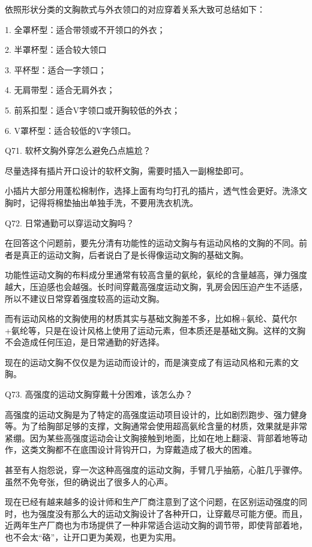 \documentclass[12pt,UTF8]{ctexbook}
\begin{document}
依照形状分类的文胸款式与外衣领口的对应穿着关系大致可总结如下：

1. 全罩杯型：适合带领或不开领口的外衣；

2. 半罩杯型：适合较大领口



3. 平杯型：适合一字领口；

4. 无肩带型：适合无肩外衣；

5. 前系扣型：适合V字领口或开胸较低的外衣；

6. V罩杯型：适合较低的V字领口。





Q71. 软杯文胸外穿怎么避免凸点尴尬？


尽量选择有插片开口设计的软杯文胸，需要时插入一副棉垫即可。

小插片大部分用蓬松棉制作，选择上面有均匀打孔的插片，透气性会更好。洗涤文胸时，记得将棉垫抽出单独手洗，不要用洗衣机洗。





Q72. 日常通勤可以穿运动文胸吗？


在回答这个问题前，要先分清有功能性的运动文胸与有运动风格的文胸的不同。前者是真正的运动文胸，后者说白了是长得像运动文胸的基础文胸。

功能性运动文胸的布料成分里通常有较高含量的氨纶，氨纶的含量越高，弹力强度越大，压迫感也会越强。长时间穿戴高强度运动文胸，乳房会因压迫产生不适感，所以不建议日常穿着强度较高的运动文胸。

而有运动风格的文胸使用的材质其实与基础文胸差不多，比如棉+氨纶、莫代尔+氨纶等，只是在设计风格上使用了运动元素，但本质还是基础文胸。这样的文胸不会造成任何压迫，是日常通勤的好选择。

现在的运动文胸不仅仅是为运动而设计的，而是演变成了有运动风格和元素的文胸。





Q73. 高强度的运动文胸穿戴十分困难，该怎么办？


高强度的运动文胸是为了特定的高强度运动项目设计的，比如剧烈跑步、强力健身等。为了给胸部足够的支撑，文胸通常会使用超高氨纶含量的材质，效果就是非常紧绷。因为某些高强度运动会让文胸接触到地面，比如在地上翻滚、背部着地等动作，这类文胸都不在底围设计背钩开口，为穿戴造成了极大的困难。

甚至有人抱怨说，穿一次这种高强度的运动文胸，手臂几乎抽筋，心脏几乎骤停。虽然不免夸张，但的确说出了很多人的心声。

现在已经有越来越多的设计师和生产厂商注意到了这个问题，在区别运动强度的同时，也为强度没有那么大的运动文胸设计了各种开口，让穿戴尽可能方便。而且，近两年生产厂商也为市场提供了一种非常适合运动文胸的调节带，即使背部着地，也不会太“硌”，让开口更为美观，也更为实用。
\end{document}
